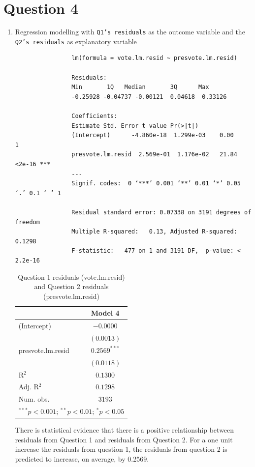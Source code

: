\documentclass[12pt,letterpaper]{article}
\begin{document}
	\section*{Question 4}
	\begin{enumerate}
		\item Regression modelling with \texttt{Q1's residuals} as the outcome variable and the \texttt{Q2's residuals} as explanatory variable
			
			\begin{verbatim}
				lm(formula = vote.lm.resid ~ presvote.lm.resid)
				
				Residuals:
				Min       1Q   Median       3Q      Max 
				-0.25928 -0.04737 -0.00121  0.04618  0.33126 
				
				Coefficients:
				Estimate Std. Error t value Pr(>|t|)    
				(Intercept)      -4.860e-18  1.299e-03    0.00        1    
				presvote.lm.resid  2.569e-01  1.176e-02   21.84   <2e-16 ***
				---
				Signif. codes:  0 ‘***’ 0.001 ‘**’ 0.01 ‘*’ 0.05 ‘.’ 0.1 ‘ ’ 1
				
				Residual standard error: 0.07338 on 3191 degrees of freedom
				Multiple R-squared:   0.13,	Adjusted R-squared:  0.1298 
				F-statistic:   477 on 1 and 3191 DF,  p-value: < 2.2e-16
			\end{verbatim}
			\begin{table}[H]
				\begin{center}
					\begin{tabular}{l c}
						\hline
						& Model 4 \\
						\hline
						(Intercept)      & $-0.0000$      \\
						& $(0.0013)$     \\
						presvote.lm.resid & $0.2569^{***}$ \\
						& $(0.0118)$     \\
						\hline
						R$^2$            & $0.1300$       \\
						Adj. R$^2$       & $0.1298$       \\
						Num. obs.        & $3193$         \\
						\hline
						\multicolumn{2}{l}{\scriptsize{$^{***}p<0.001$; $^{**}p<0.01$; $^{*}p<0.05$}}
					\end{tabular}
					\caption{Question 1 residuals (vote.lm.resid) and Question 2 residuals (presvote.lm.resid)}
					\label{table:coefficients}
				\end{center}
			\end{table}
		There is statistical evidence that there is a positive relationship between residuals from Question 1 and residuals from Question 2. For a one unit increase the residuals from question 1, the residuals from question 2 is predicted to increase, on average, by 0.2569.
		

\end{enumerate}
\end{document}
